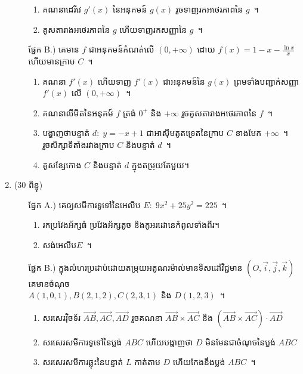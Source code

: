 \documentclass[12pt,a4paper]{article}
\def\hard{\leavevmode\makebox[0pt][r]{\large\ensuremath{\star}\hspace{2em}}}
\begin{document}
\begin{enumerate}[I]
\begin{itemize}
\begin{enumerate}[a]
\item គណនាដេរីវេ $ g'(x) $ នៃអនុគមន៍ $ g(x) $ រួចទាញរកអថេរភាពនៃ $ g $~។
\item គូសតារាងអថេរភាពនៃ $ g $ ហើយទាញរកសញ្ញានៃ $ g $~។
\end{enumerate}
\item[ផ្នែក B.)] គេមាន $ f $ ជាអនុគមន៍កំណត់លើ $ (0,+\infty) $ ដោយ $ f(x)=1-x-\frac{\ln x}{x} $ ហើយមានក្រាប $ C $~។
\begin{enumerate}[a]
\item គណនា $ f'(x) $ ហើយទាញ $ f'(x) $ ជាអនុគមន៍នៃ $ g(x) $ ព្រមទាំងបញ្ជាក់សញ្ញា $ f'(x) $ លើ $ (0,+\infty) $~។
\item គណនាលីមីត​នៃអនុគម៍ $ f $ ត្រង់ $ 0^+ $ និង $ +\infty $ រួចគូសតារាងអថេរភាពនៃ $ f $~។
\item បង្ហាញថាបន្ទាត់ $ d:\;y=-x+1 $ ជាអាស៊ីមតូតទ្រេតនៃក្រាប $ C $ ខាងមែក $ +\infty $~។\\
រួចសិក្សាទីតាំងរវាងក្រាប $ C $ និងបន្ទាត់ $ d $~។
\item គូសខ្សែកោង $ C $ និងបន្ទាត់ $ d $ ក្នុងតម្រុយតែមួយ។
\end{enumerate}
\end{itemize}
\item\hard ($ 30 $ ពិន្ទុ) 
\begin{itemize}
\item[ផ្នែក A.)] គេឲ្យសមីការទូទៅនៃអេលីប $ E:\;9x^2+25y^2=225 $~។
\begin{enumerate}[a]
\item រកប្រវែងអ័ក្សធំ ប្រវែងអ័ក្សតូច និងកូអរដោនេកំពូលទាំងពីរ។
\item សង់អេលីប​ $ E $~។
\end{enumerate}
\item[ផ្នែក B.)] ក្នុងលំហរប្រដាប់ដោយតម្រុយអតូណរម៉ាល់មានទិសដៅវិជ្ជមាន $ (O,\vec{i},\vec{j},\vec{k}) $ គេមានចំណុច​\\
$ A(1,0,1),B(2,1,2),C(2,3,1) $ និង $ D(1,2,3) $~។
\begin{enumerate}[a]
\item សរសេរវ៉ិចទ័រ $ \overrightarrow{AB},\overrightarrow{AC},\overrightarrow{AD} $ រួចគណនា $ \overrightarrow{AB}\times\overrightarrow{AC} $ និង $ (\overrightarrow{AB}\times\overrightarrow{AC})\cdot\overrightarrow{AD} $
\item សរសេរសមីការទូទៅនៃប្លង់ $ ABC $ ហើយបង្ហាញថា $ D $ មិនមែនជាចំណុចនៃប្លង់ $ ABC $
\item សរសេរសមីការឆ្លុះនៃបន្ទាត់ $ L $ កាត់តាម $ D $ ហើយកែងនឹងប្លង់ $ ABC $~។
\end{enumerate}
\end{itemize}
\end{enumerate}
\end{document}
